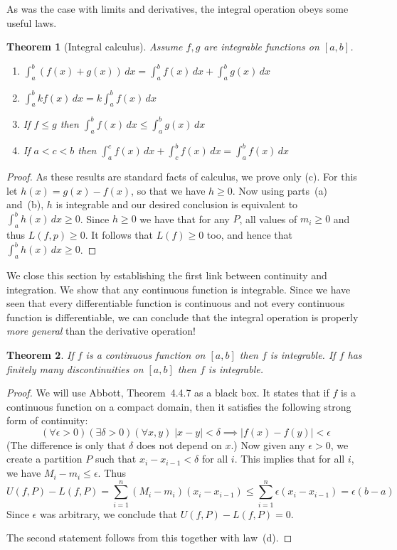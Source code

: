 \documentclass[11pt,oneside]{amsbook}
\theoremstyle{definition}
\theoremstyle{plain}
\newtheorem{theorem}{Theorem}[section]
\theoremstyle{definition}
\theoremstyle{remark}
\numberwithin{equation}{section}
\numberwithin{figure}{section}
\begin{document}
As was the case with limits and derivatives, the integral operation obeys some useful laws.

\begin{theorem}[Integral calculus]
  Assume $f,g$ are integrable functions on $[a,b]$.
  \begin{enumerate}
    \item $\int_a^b(f(x)+g(x))\,dx=\int_a^bf(x)\,dx+\int_a^bg(x)\,dx$
    \item $\int_a^bkf(x)\,dx=k\int_a^bf(x)\,dx$
    \item If $f\leq g$ then $\int_a^bf(x)\,dx\leq\int_a^bg(x)\,dx$
    \item If $a<c<b$ then $\int_a^cf(x)\,dx+\int_c^bf(x)\,dx=\int_a^bf(x)\,dx$
  \end{enumerate}
\end{theorem}

\begin{proof}
  As these results are standard facts of calculus, we prove only (c). For this let $h(x)=g(x)-f(x)$, so that we have $h\geq0$. Now using parts~(a) and~(b), $h$ is integrable and our desired conclusion is equivalent to $\int_a^bh(x)\,dx\geq0$. Since $h\geq0$ we have that for any $P$, all values of $m_i\geq0$ and thus $L(f,p)\geq0$. It follows that $L(f)\geq0$ too, and hence that $\int_a^bh(x)\,dx\geq0$.
\end{proof}

We close this section by establishing the first link between continuity and integration. We show that any continuous function is integrable. Since we have seen that every differentiable function is continuous and not every continuous function is differentiable, we can conclude that the integral operation is properly \emph{more general} than the derivative operation!

\begin{theorem}
  If $f$ is a continuous function on $[a,b]$ then $f$ is integrable. If $f$ has finitely many discontinuities on $[a,b]$ then $f$ is integrable.
\end{theorem}

\begin{proof}
  We will use Abbott, Theorem~4.4.7 as a black box. It states that if $f$ is a continuous function on a compact domain, then it satisfies the following strong form of continuity:
  \[(\forall\epsilon>0)(\exists\delta>0)(\forall x,y)\;
  |x-y|<\delta\implies|f(x)-f(y)|<\epsilon
  \]
  (The difference is only that $\delta$ does not depend on $x$.) Now given any $\epsilon>0$, we create a partition $P$ such that $x_i-x_{i-1}<\delta$ for all $i$. This implies that for all $i$, we have $M_i-m_i\leq\epsilon$. Thus
  \[U(f,P)-L(f,P)=\sum_{i=1}^n(M_i-m_i)(x_i-x_{i-1})\leq\sum_{i=1}^n\epsilon(x_i-x_{i-1})
  =\epsilon(b-a)
  \]
  Since $\epsilon$ was arbitrary, we conclude that $U(f,P)-L(f,P)=0$.
  
  The second statement follows from this together with law~(d).
\end{proof}
\end{document}
